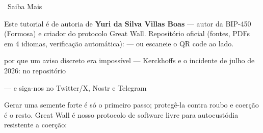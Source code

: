 \documentclass[10pt]{article}
\begin{document}
\begin{infobox}{\faInfoCircle~Saiba Mais}
\begin{minipage}[c]{0.8\textwidth}
Este tutorial é de autoria de \textbf{Yuri da Silva Villas Boas} --- autor da BIP-450 (Formosa) e criador do protocolo Great Wall. Repositório oficial (fontes, PDFs em 4 idiomas, verificação automática): \repolink --- ou escaneie o QR code ao lado.

\begin{description}[itemsep=1pt]
 \item [Artigo curto:] por que um aviso discreto era impossível --- Kerckhoffs e o incidente de julho de 2026: \paperlink no repositório
 \item [Mais tutoriais, cursos e comunidade:] \sitelink --- e siga-nos no Twitter/X, Nostr e Telegram
 \item [Great Wall:] Gerar uma semente forte é só o primeiro passo; protegê-la contra roubo e coerção é o resto. Great Wall é nosso protocolo de software livre para autocustódia resistente a coerção: \gwlink
\end{description}

\end{minipage}%
\hfill
\begin{minipage}[c]{0.15\textwidth}
\centering
\repoqr
\end{minipage}
\end{infobox}

\end{document}
